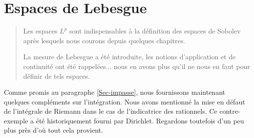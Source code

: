 \chapter{Espaces de Lebesgue}
\begin{abstract}
Les espaces $L^p$ sont indispensables à la définition des espaces de Sobolev après
lesquels nous courons depuis quelques chapitres.

La mesure de Lebesgue a été introduite, les notions d'application et
de continuité ont été rappelées... nous en avons plus qu'il ne nous en faut
pour définir de tels espaces.
\end{abstract}
Comme promis au paragraphe \ref{Sec-impasse}, nous fournissons maintenant quelques compléments sur l'intégration. Nous avons mentionné la mise en défaut de l'intégrale de Riemann dans le cas de l'indicatrice des rationnels.
Ce contre-exemple a été historiquement fourni par Dirichlet.
Regardons toutefois d'un peu plus près d'où tout cela provient.

